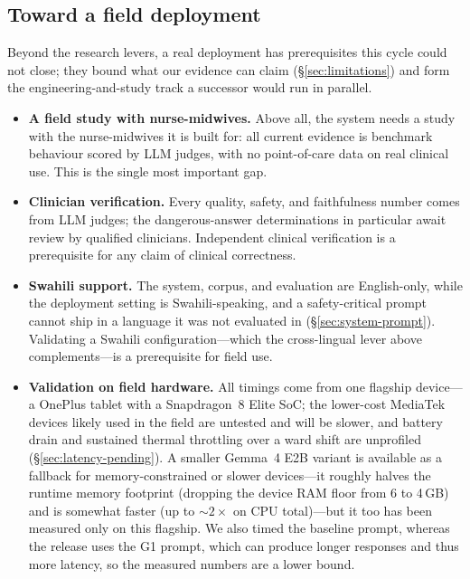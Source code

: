 \subsection{Toward a field deployment}

Beyond the research levers, a real deployment has prerequisites this cycle could
not close; they bound what our evidence can claim (\S\ref{sec:limitations}) and
form the engineering-and-study track a successor would run in parallel.

\begin{itemize}\setlength{\itemsep}{2.5pt}
  \item \textbf{A field study with nurse-midwives.} Above all, the system needs
  a study with the nurse-midwives it is built for: all current evidence is
  benchmark behaviour scored by LLM judges, with no point-of-care data on real
  clinical use. This is the single most important gap.
  \item \textbf{Clinician verification.} Every quality, safety, and faithfulness
  number comes from LLM judges; the dangerous-answer determinations in particular
  await review by qualified clinicians. Independent clinical verification is a
  prerequisite for any claim of clinical correctness.
  \item \textbf{Swahili support.} The system, corpus, and evaluation are
  English-only, while the deployment setting is Swahili-speaking, and a
  safety-critical prompt cannot ship in a language it was not evaluated in
  (\S\ref{sec:system-prompt}). Validating a Swahili configuration---which the
  cross-lingual lever above complements---is a prerequisite for field use.
  \item \textbf{Validation on field hardware.} All timings come from one flagship
  device---a OnePlus tablet with a Snapdragon~8 Elite SoC; the lower-cost
  MediaTek devices likely used in the field are untested and will be slower, and
  battery drain and sustained thermal throttling over a ward shift are unprofiled
  (\S\ref{sec:latency-pending}). A smaller Gemma~4 E2B variant is available as a
  fallback for memory-constrained or slower devices---it roughly halves the
  runtime memory footprint (dropping the device RAM floor from 6 to 4\,GB) and is
  somewhat faster (up to ${\sim}2\times$ on CPU total)---but it too has been
  measured only on this flagship. We also timed the baseline prompt, whereas the
  release uses the G1 prompt, which can produce longer responses and thus more
  latency, so the measured numbers are a lower bound.
\end{itemize}

